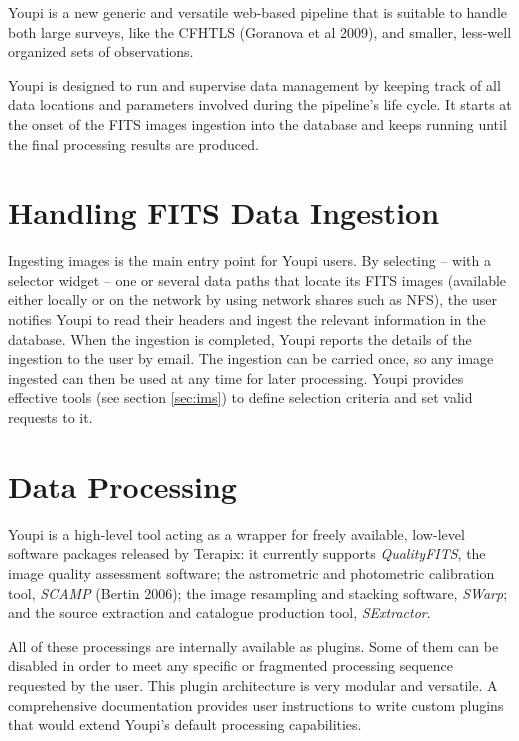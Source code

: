 \documentclass[11pt,twoside]{article}  %
\begin{document}
Youpi is a new generic and versatile web-based pipeline that is suitable to handle both large 
surveys, like the CFHTLS (Goranova et al 2009), and smaller, less-well organized sets of 
observations. 

Youpi is designed to run and supervise data management by keeping track of all data locations 
and parameters involved during the pipeline's life cycle. It starts at the onset of the FITS 
images ingestion into the database and keeps running until the final processing results are 
produced.

\section{Handling FITS Data Ingestion}

Ingesting images is the main entry point for Youpi users. By selecting -- with a selector widget -- 
one or several data paths that locate its FITS images (available either locally or on the network 
by using network shares such as NFS), the user notifies Youpi to read their headers and ingest 
the relevant information in the database. When the ingestion is completed, Youpi reports the 
details of the ingestion to the user by email. The ingestion can be carried once, so any image 
ingested can then be used at any time for later processing. Youpi provides effective tools 
(see section \ref{sec:ims}) to define selection criteria and set valid requests to it. 

\section{Data Processing}

Youpi is a high-level tool acting as a wrapper for freely available, low-level software packages 
released by Terapix: it currently supports \emph{QualityFITS}, the image 
quality assessment software; the astrometric and photometric calibration tool, \emph{SCAMP} 
(Bertin 2006); the image resampling and stacking software, \emph{SWarp}; and the source extraction 
and catalogue production tool, \emph{SExtractor}.

All of these processings are internally available as plugins. Some of them can be disabled 
in order to meet any specific or fragmented processing sequence requested by the user. This 
plugin architecture is very modular and versatile. A comprehensive documentation provides user 
instructions to write custom plugins that would extend Youpi's default processing capabilities.
\end{document}
